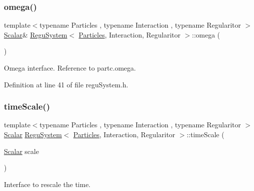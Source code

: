 \mbox{\label{class_regu_system_aec2d17af65cb81385adfd77eba8122c0}} 
\subsubsection{\texorpdfstring{omega()}{omega()}}
{\footnotesize\ttfamily template$<$typename Particles , typename Interaction , typename Regularitor $>$ \\
\mbox{\hyperlink{class_regu_system_afa2cfdbfed4cc8fa879ca715c78ff240}{Scalar}}\& \mbox{\hyperlink{class_regu_system}{Regu\+System}}$<$ \mbox{\hyperlink{struct_particles}{Particles}}, Interaction, Regularitor $>$\+::omega (\begin{DoxyParamCaption}{ }\end{DoxyParamCaption})\hspace{0.3cm}{\ttfamily [inline]}}



Omega interface. Reference to partc.\+omega. 



Definition at line 41 of file regu\+System.\+h.

\mbox{\label{class_regu_system_ac6d3e3cac21890f0af114f364f853cda}} 
\subsubsection{\texorpdfstring{time\+Scale()}{timeScale()}}
{\footnotesize\ttfamily template$<$typename Particles , typename Interaction , typename Regularitor $>$ \\
\mbox{\hyperlink{class_regu_system_afa2cfdbfed4cc8fa879ca715c78ff240}{Scalar}} \mbox{\hyperlink{class_regu_system}{Regu\+System}}$<$ \mbox{\hyperlink{struct_particles}{Particles}}, Interaction, Regularitor $>$\+::time\+Scale (\begin{DoxyParamCaption}\item[{\mbox{\hyperlink{class_regu_system_afa2cfdbfed4cc8fa879ca715c78ff240}{Scalar}}}]{scale }\end{DoxyParamCaption})\hspace{0.3cm}{\ttfamily [inline]}}



Interface to rescale the time. 

